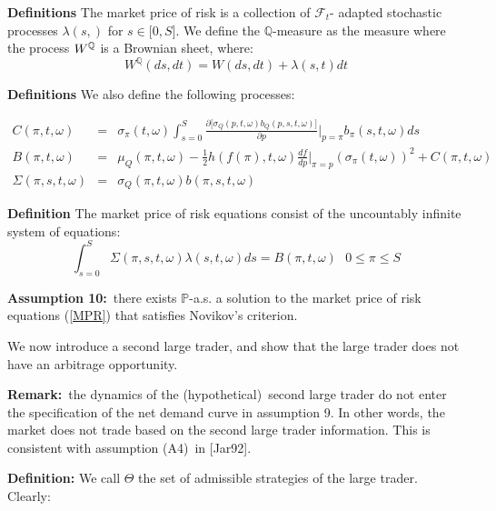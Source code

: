 \documentclass{article}
\begin{document}
\bigskip

\textbf{Definitions} The market price of risk is a collection of $\mathcal{F}%
_{t}$- adapted stochastic processes $\lambda (s,)$ for $s\in \lbrack 0,S]$.
We define the $\mathbb{Q}$-measure as the measure where the process $W^{%
\mathbb{Q}}$ is a Brownian sheet, where:%
\begin{equation}
W^{\mathbb{Q}}(ds,dt)=W(ds,dt)+\lambda (s,t)dt  \label{WQ}
\end{equation}

\textbf{Definitions }We also define the following processes:

\begin{eqnarray*}
C(\pi ,t,\omega ) &=&\sigma _{\pi }(t,\omega )\int_{s=0}^{S}\frac{\partial
\lbrack \sigma _{Q}(p,t,\omega )b_{Q}(p,s,t,\omega )]}{\partial p}|_{p=\pi
}b_{\pi }(s,t,\omega )ds \\
B(\pi ,t,\omega ) &=&\mu _{Q}(\pi ,t,\omega )-\frac{1}{2}h(f(\pi ),t,\omega )%
\frac{df}{dp}|_{\pi =p}(\sigma _{\pi }(t,\omega ))^{2}+C(\pi ,t,\omega ) \\
\Sigma (\pi ,s,t,\omega ) &=&\sigma _{Q}(\pi ,t,\omega )b(\pi ,s,t,\omega )
\end{eqnarray*}

\textbf{Definition }The market price of risk equations consist of the
uncountably infinite system of equations: 
\begin{equation}
\int_{s=0}^{S}\Sigma (\pi ,s,t,\omega )\lambda (s,t,\omega )ds=B(\pi
,t,\omega )\text{ \ \ \ \ \ }0\leq \pi \leq S  \label{MPR}
\end{equation}

\textbf{Assumption 10:}\ there exists $\mathbb{P}$-a.s. a solution to the
market price of risk equations (\ref{MPR}) that satisfies Novikov's
criterion.

\bigskip

We now introduce a second large trader, and show that the large trader does
not have an arbitrage opportunity.

\bigskip

\textbf{Remark:}\ the dynamics of the (hypothetical)\ second large trader do
not enter the specification of the net demand curve in assumption 9. In
other words, the market does not trade based on the second large trader
information. This is consistent with assumption (A4)\ in [Jar92].

\bigskip

\textbf{Definition:} We call $\Theta $ the set of admissible strategies of
the large trader. Clearly:
\end{document}
